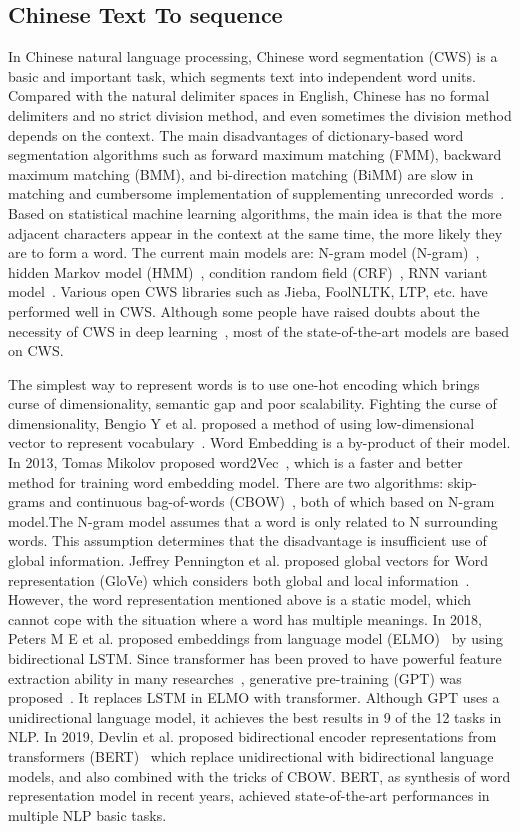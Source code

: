 \subsection{Chinese Text To sequence}
In Chinese natural language processing, Chinese word segmentation (CWS) is a basic and important task, which segments text into independent word units. Compared with the natural delimiter spaces in English, Chinese has no formal delimiters and no strict division method, and even sometimes the division method depends on the context. The main disadvantages of dictionary-based word segmentation algorithms such as forward maximum matching (FMM), backward maximum matching (BMM), and bi-direction matching (BiMM) are slow in matching and cumbersome implementation of supplementing unrecorded words~\cite{CWS10yearReview}. Based on statistical machine learning algorithms, the main idea is that the more adjacent characters appear in the context at the same time, the more likely they are to form a word. The current main models are: N-gram model (N-gram)~\cite{N-gram}, hidden Markov model (HMM)~\cite{HMM}, condition random field (CRF)~\cite{CRF}, RNN variant model~\cite{LSTM-CWS,Bi-LSTM-CWS}. Various open CWS libraries such as Jieba, FoolNLTK, LTP, etc. have performed well in CWS. Although some people have raised doubts about the necessity of CWS in deep learning~\cite{WS-is-necessary}, most of the state-of-the-art models are based on CWS.

The simplest way to represent words is to use one-hot encoding which brings curse of dimensionality, semantic gap and poor scalability. Fighting the curse of dimensionality, Bengio Y et al. proposed a method of using low-dimensional vector to represent vocabulary~\cite{proposed-Embedding}. Word Embedding is a by-product of their model. In 2013, Tomas Mikolov proposed word2Vec~\cite{word2Vec}, which is a faster and better method for training word embedding model. There are two algorithms: skip-grams and continuous bag-of-words (CBOW)~\cite{CBOW}, both of which based on N-gram model.The N-gram model assumes that a word is only related to N surrounding words. This assumption determines that the disadvantage is insufficient use of global information. Jeffrey Pennington et al. proposed global vectors for Word representation (GloVe) which considers both global and local information~\cite{glove}. However, the word representation mentioned above is a static model, which cannot cope with the situation where a word has multiple meanings. In 2018, Peters M E et al. proposed embeddings from language model (ELMO)~\cite{ELMO} by using bidirectional LSTM. Since transformer has been proved to have powerful feature extraction ability in many researches~\cite{vaswani2017Transformer}, generative pre-training (GPT) was proposed~\cite{GPT}. It replaces LSTM in ELMO with transformer. Although GPT uses a unidirectional language model, it achieves the best results in 9 of the 12 tasks in NLP. In 2019, Devlin et al. proposed bidirectional encoder representations from transformers (BERT)~\cite{BERT} which replace unidirectional with bidirectional language models, and also combined with the tricks of CBOW. BERT, as synthesis of word representation model in recent years, achieved state-of-the-art performances in multiple NLP basic tasks.

